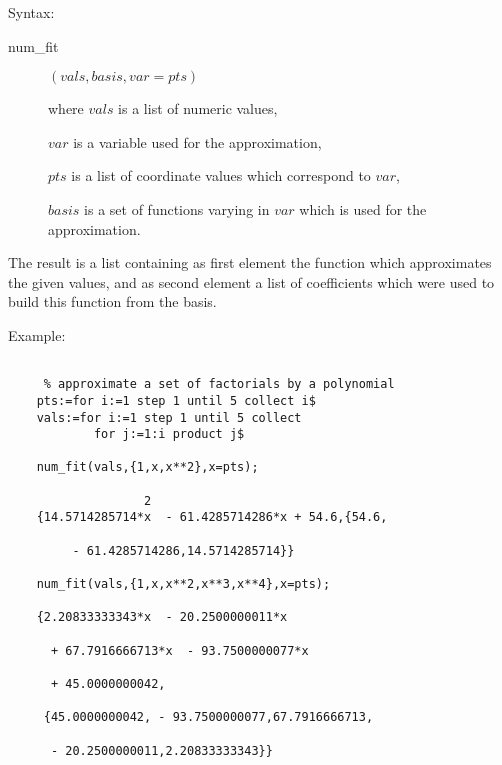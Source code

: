 Syntax:

\begin{description}
\item[num\_fit] $(vals,basis,var=pts)$

where $vals$ is a list of numeric values,

$var$ is a variable used for the approximation,

$pts$ is a list of coordinate values which correspond to $var$,

$basis$ is a set of functions varying in $var$ which is used
  for the approximation.

\end{description}

The result is a list containing as first element the
function which approximates the given values, and as
second element a list of coefficients which were used
to build this function from the basis.

Example:

\begin{verbatim}

     % approximate a set of factorials by a polynomial
    pts:=for i:=1 step 1 until 5 collect i$
    vals:=for i:=1 step 1 until 5 collect
            for j:=1:i product j$

    num_fit(vals,{1,x,x**2},x=pts);

                   2
    {14.5714285714*x  - 61.4285714286*x + 54.6,{54.6,

         - 61.4285714286,14.5714285714}}

    num_fit(vals,{1,x,x**2,x**3,x**4},x=pts);

    {2.20833333343*x  - 20.2500000011*x

      + 67.7916666713*x  - 93.7500000077*x

      + 45.0000000042,

     {45.0000000042, - 93.7500000077,67.7916666713,

      - 20.2500000011,2.20833333343}}
\end{verbatim}
